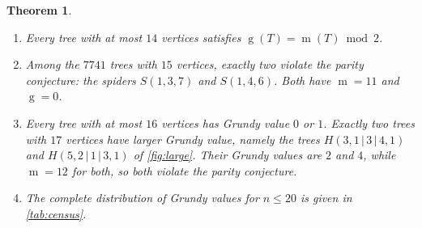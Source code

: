 \documentclass[11pt]{amsart}
\newtheorem{theorem}{Theorem}[section]
\theoremstyle{definition}
\theoremstyle{remark}
\newcommand{\gv}{\operatorname{g}}           %
\newcommand{\m}{\operatorname{m}}
\newcommand{\Sp}{S}
\begin{document}
\begin{theorem}\label{thm:census}
\leavevmode
\begin{enumerate}[label=\textup{(\alph*)}]
\item Every tree with at most $14$ vertices satisfies $\gv(T)=\m(T)\bmod2$.
\item Among the $7741$ trees with $15$ vertices, exactly two violate the parity conjecture: the spiders $\Sp(1,3,7)$ and $\Sp(1,4,6)$. Both have $\m=11$ and $\gv=0$.
\item Every tree with at most $16$ vertices has Grundy value $0$ or $1$. Exactly two trees with $17$ vertices have larger Grundy value, namely the trees $H(3,1\,|\,3\,|\,4,1)$ and $H(5,2\,|\,1\,|\,3,1)$ of \cref{fig:large}. Their Grundy values are $2$ and $4$, while $\m=12$ for both, so both violate the parity conjecture.
\item The complete distribution of Grundy values for $n\le 20$ is given in \cref{tab:census}.
\end{enumerate}
\end{theorem}
\end{document}
